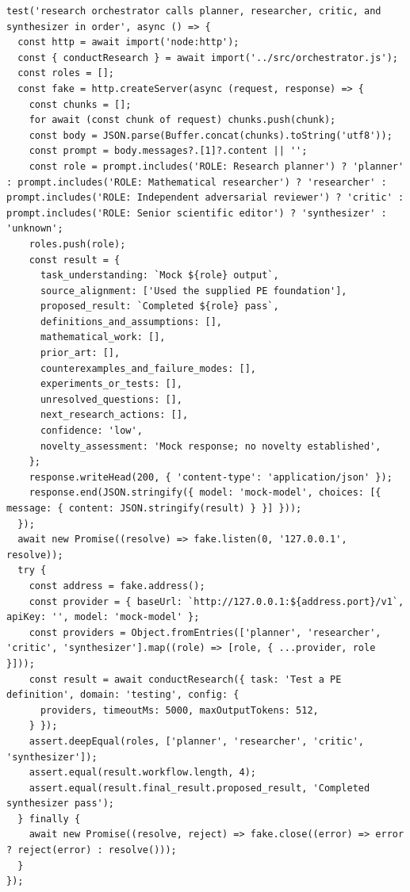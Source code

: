 \documentclass[10pt,a4paper]{article}
\begin{document}
\begin{lstlisting}
test('research orchestrator calls planner, researcher, critic, and synthesizer in order', async () => {
  const http = await import('node:http');
  const { conductResearch } = await import('../src/orchestrator.js');
  const roles = [];
  const fake = http.createServer(async (request, response) => {
    const chunks = [];
    for await (const chunk of request) chunks.push(chunk);
    const body = JSON.parse(Buffer.concat(chunks).toString('utf8'));
    const prompt = body.messages?.[1]?.content || '';
    const role = prompt.includes('ROLE: Research planner') ? 'planner' : prompt.includes('ROLE: Mathematical researcher') ? 'researcher' : prompt.includes('ROLE: Independent adversarial reviewer') ? 'critic' : prompt.includes('ROLE: Senior scientific editor') ? 'synthesizer' : 'unknown';
    roles.push(role);
    const result = {
      task_understanding: `Mock ${role} output`,
      source_alignment: ['Used the supplied PE foundation'],
      proposed_result: `Completed ${role} pass`,
      definitions_and_assumptions: [],
      mathematical_work: [],
      prior_art: [],
      counterexamples_and_failure_modes: [],
      experiments_or_tests: [],
      unresolved_questions: [],
      next_research_actions: [],
      confidence: 'low',
      novelty_assessment: 'Mock response; no novelty established',
    };
    response.writeHead(200, { 'content-type': 'application/json' });
    response.end(JSON.stringify({ model: 'mock-model', choices: [{ message: { content: JSON.stringify(result) } }] }));
  });
  await new Promise((resolve) => fake.listen(0, '127.0.0.1', resolve));
  try {
    const address = fake.address();
    const provider = { baseUrl: `http://127.0.0.1:${address.port}/v1`, apiKey: '', model: 'mock-model' };
    const providers = Object.fromEntries(['planner', 'researcher', 'critic', 'synthesizer'].map((role) => [role, { ...provider, role }]));
    const result = await conductResearch({ task: 'Test a PE definition', domain: 'testing', config: {
      providers, timeoutMs: 5000, maxOutputTokens: 512,
    } });
    assert.deepEqual(roles, ['planner', 'researcher', 'critic', 'synthesizer']);
    assert.equal(result.workflow.length, 4);
    assert.equal(result.final_result.proposed_result, 'Completed synthesizer pass');
  } finally {
    await new Promise((resolve, reject) => fake.close((error) => error ? reject(error) : resolve()));
  }
});
\end{lstlisting}
\end{document}
